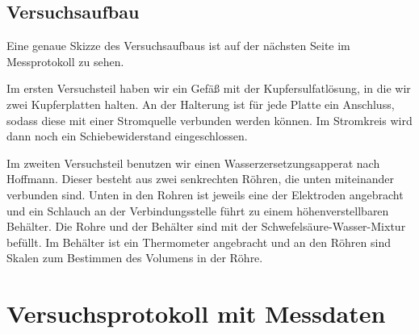 \documentclass{article}
\begin{document}
\subsection{Versuchsaufbau}

Eine genaue Skizze des Versuchsaufbaus ist auf der nächsten Seite im Messprotokoll zu sehen.

Im ersten Versuchsteil haben wir ein Gefäß mit der Kupfersulfatlösung, in die wir zwei Kupferplatten halten. An der Halterung ist für jede Platte ein Anschluss, sodass diese mit einer Stromquelle verbunden werden können. Im Stromkreis wird dann noch ein Schiebewiderstand eingeschlossen.

Im zweiten Versuchsteil benutzen wir einen Wasserzersetzungsapperat nach Hoffmann. Dieser besteht aus zwei senkrechten Röhren, die unten miteinander verbunden sind. Unten in den Rohren ist jeweils eine der Elektroden angebracht und ein Schlauch an der Verbindungsstelle führt zu einem höhenverstellbaren Behälter. Die Rohre und der Behälter sind mit der Schwefelsäure-Wasser-Mixtur befüllt. Im Behälter ist ein Thermometer angebracht und an den Röhren sind Skalen zum Bestimmen des Volumens in der Röhre.  

\newpage

\section{Versuchsprotokoll mit Messdaten}
\end{document}
